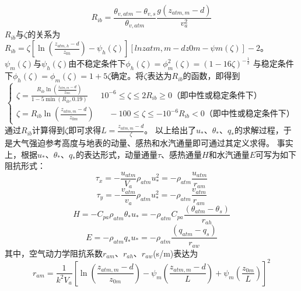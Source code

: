 \begin{equation}
R_{i b}=\frac{\theta_{v, atm}-\theta_{v, s}}{\theta_{v, atm}} \frac{g\left(z_{atm, m}-d\right)}{v_{a}^{2}}
\end{equation}
$R_{ib}$与$\zeta$的关系为$R_{ib}=\zeta[\ln{\left(\frac{z_{atm,h}-d}{z_{0h}}\right)-\psi_h(\zeta)}][lnzatm,m-dz0m-ψm(ζ)]-2$。
$\psi_m(\zeta)$与$\psi_h(\zeta)$由不稳定条件下$\phi_h\left(\zeta\right)=\phi_m^2\left(\zeta\right)=\left(1-16\zeta\right)^{-\frac{1}{2}}$ 
与稳定条件下$\phi_h\left(\zeta\right)=\phi_m\left(\zeta\right)=1+5\zeta$确定。将$\zeta$表达为$R_{ib}$的函数，即得到
\begin{equation}
\left\{\begin{array}{c}\zeta=\frac{R_{i b} \ln \left(\frac{z_{atm, m}-d}{z_{0 m}}\right)}{1-5 \min \left(R_{i b}, 0.19\right)} \ \ \ \ \ \ \  10^{-6} \leq \zeta \leq 2 R_{i b} \geq 0 \text{（即中性或稳定条件下）}
    \\ \zeta=R_{i b} \ln \left(\frac{z_{atm, m}-d}{z_{0 m}}\right) \ \ \ \ \ \ \ \ -100 \leq \zeta \leq-10^{-6} R_{i b}<0 \text{（即中性或稳定条件下）}\end{array}\right.
\end{equation}
通过$R_{ib}$计算得到$\zeta$即可求得$L=\frac{z_{atm,m}-d}{\zeta}$。
以上给出了$u_\ast$、$\theta_\ast$、$q_\ast$的求解过程，于是大气强迫参考高度与地表的动量、感热和水汽通量即可通过其定义求得。
事实上，根据$u_\ast$、$\theta_\ast$、$q_\ast$的表达形式，动量通量$\tau$、感热通量$H$和水汽通量$E$可写为如下阻抗形式：
\begin{equation}
\tau_{x}=-\frac{u_{atm}}{V_{a}} \rho_{atm} u_{*}^{2}=-\rho_{atm} \frac{u_{atm}}{r_{a m}}
\end{equation}
\begin{equation}
\tau_{y}=-\frac{v_{atm}}{v_{a}} \rho_{atm} u_{*}^{2}=-\rho_{atm} \frac{v_{atm}}{r_{a m}}
\end{equation}
\begin{equation}
H=-C_{p a} \rho_{atm} \theta_{*} u_{*}=-\rho_{atm} C_{p a} \frac{\left(\theta_{atm}-\theta_{s}\right)}{r_{a h}}
\end{equation}
\begin{equation}
E=-\rho_{atm} q_{*} u_{*}=-\rho_{atm} \frac{\left(q_{atm}-q_{s}\right)}{r_{a w}}
\end{equation}
其中，空气动力学阻抗系数$r_{am}$、$r_{ah}$、$r_{aw}$(s/m)表达为
\begin{equation}
r_{a m}=\frac{1}{k^{2} V_{a}}\left[\ln \left(\frac{z_{atm, m}-d}{z_{0 m}}\right)-\psi_{m}\left(\frac{z_{atm, m}-d}{L}\right)+\psi_{m}\left(\frac{z_{0 m}}{L}\right)\right]^{2}
\end{equation}
